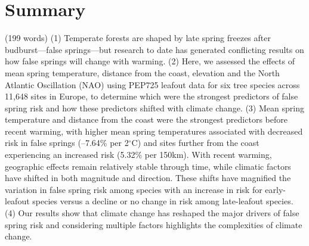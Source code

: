\documentclass{article}\usepackage[]{graphicx}\usepackage[]{color}
\begin{document}
\renewcommand{\thetable}{\arabic{table}}
\renewcommand{\thefigure}{\arabic{figure}}
\renewcommand{\labelitemi}{$-$}




\section*{Summary} (199 words)
(1) Temperate forests are shaped by late spring freezes after budburst---false springs---but research to date has generated conflicting results on how false springs will change with warming. 
(2) Here, we assessed the effects of mean spring temperature, distance from the coast, elevation and the North Atlantic Oscillation (NAO) using PEP725 leafout data for six tree species across 11,648 sites in Europe, to determine which were the strongest predictors of false spring risk and how these predictors shifted with climate change. 
(3) Mean spring temperature and distance from the coast were the strongest predictors before recent warming, with higher mean spring temperatures associated with decreased risk in false springs (--7.64\% per 2$^{\circ}$C) and sites further from the coast experiencing an increased risk (5.32\% per 150km). With recent warming, geographic effects remain relatively stable through time, while climatic factors have shifted in both magnitude and direction. These shifts have magnified the variation in false spring risk among species with an increase in risk for early-leafout species %
versus a decline or no change in risk among late-leafout species. %
(4) Our results show that climate change has reshaped the major drivers of false spring risk and considering multiple factors highlights the complexities of climate change.
\end{document}
